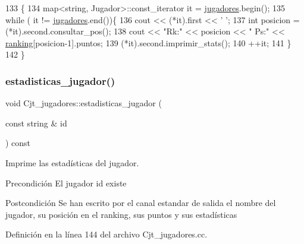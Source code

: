 \begin{DoxyCode}
133 \{
134   map<string, Jugador>::const\_iterator it = \hyperlink{class_cjt__jugadores_ae3fc5f98e0f343b039bd7dff0e616ecc}{jugadores}.begin();
135   \textcolor{keywordflow}{while} ( it != \hyperlink{class_cjt__jugadores_ae3fc5f98e0f343b039bd7dff0e616ecc}{jugadores}.end())\{
136     cout << (*it).first << \textcolor{charliteral}{' '};
137     \textcolor{keywordtype}{int} posicion = (*it).second.consultar\_pos();
138     cout << \textcolor{stringliteral}{"Rk:"} << posicion << \textcolor{stringliteral}{" Ps:"} << \hyperlink{class_cjt__jugadores_a2a64dd6a0c9315af038dfdb4c27da059}{ranking}[posicion-1].puntos;
139     (*it).second.imprimir\_stats();
140     ++it;
141   \}   
142 \}
\end{DoxyCode}
\mbox{\label{class_cjt__jugadores_a4c2e7064b8c6f2647dfb086c6d161bfd}} 
\subsubsection{\texorpdfstring{estadisticas\+\_\+jugador()}{estadisticas\_jugador()}}
{\footnotesize\ttfamily void Cjt\+\_\+jugadores\+::estadisticas\+\_\+jugador (\begin{DoxyParamCaption}\item[{const string \&}]{id }\end{DoxyParamCaption}) const}



Imprime las estadísticas del jugador. 

\begin{DoxyPrecond}{Precondición}
El jugador id existe 
\end{DoxyPrecond}
\begin{DoxyPostcond}{Postcondición}
Se han escrito por el canal estandar de salida el nombre del jugador, su posición en el ranking, sus puntos y sus estadísticas 
\end{DoxyPostcond}


Definición en la línea 144 del archivo Cjt\+\_\+jugadores.\+cc.


